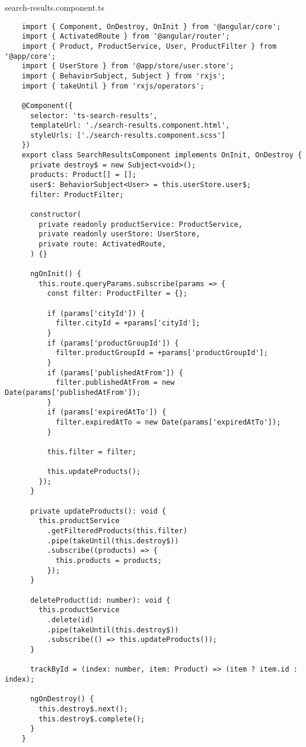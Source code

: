 search-results.component.ts
\lstset{style=ts}
\begin{lstlisting}
    import { Component, OnDestroy, OnInit } from '@angular/core';
    import { ActivatedRoute } from '@angular/router';
    import { Product, ProductService, User, ProductFilter } from '@app/core';
    import { UserStore } from '@app/store/user.store';
    import { BehaviorSubject, Subject } from 'rxjs';
    import { takeUntil } from 'rxjs/operators';
    
    @Component({
      selector: 'ts-search-results',
      templateUrl: './search-results.component.html',
      styleUrls: ['./search-results.component.scss']
    })
    export class SearchResultsComponent implements OnInit, OnDestroy {
      private destroy$ = new Subject<void>();
      products: Product[] = [];
      user$: BehaviorSubject<User> = this.userStore.user$;
      filter: ProductFilter;
    
      constructor(
        private readonly productService: ProductService,
        private readonly userStore: UserStore,
        private route: ActivatedRoute,
      ) {}
    
      ngOnInit() {
        this.route.queryParams.subscribe(params => {
          const filter: ProductFilter = {};
    
          if (params['cityId']) {
            filter.cityId = +params['cityId'];
          }
          if (params['productGroupId']) {
            filter.productGroupId = +params['productGroupId'];
          }
          if (params['publishedAtFrom']) {
            filter.publishedAtFrom = new Date(params['publishedAtFrom']);
          }
          if (params['expiredAtTo']) {
            filter.expiredAtTo = new Date(params['expiredAtTo']);
          }
    
          this.filter = filter;
    
          this.updateProducts();
        });
      }
    
      private updateProducts(): void {
        this.productService
          .getFilteredProducts(this.filter)
          .pipe(takeUntil(this.destroy$))
          .subscribe((products) => {
            this.products = products;
          });
      }
    
      deleteProduct(id: number): void {
        this.productService
          .delete(id)
          .pipe(takeUntil(this.destroy$))
          .subscribe(() => this.updateProducts());
      }
    
      trackById = (index: number, item: Product) => (item ? item.id : index);
    
      ngOnDestroy() {
        this.destroy$.next();
        this.destroy$.complete();
      }
    }    
\end{lstlisting}

